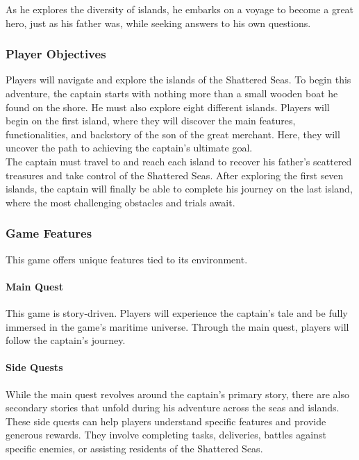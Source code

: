 \documentclass{article}
\begin{document}
As he explores the diversity of islands, he embarks on a voyage to become a great hero, just as his father was, while seeking answers to his own questions.



\subsubsection{Player Objectives}\hfill

Players will navigate and explore the islands of the Shattered Seas. To begin this adventure, the captain starts with nothing more than a small wooden boat he found on the shore. He must also explore eight different islands. Players will begin on the first island, where they will discover the main features, functionalities, and backstory of the son of the great merchant. Here, they will uncover the path to achieving the captain’s ultimate goal.\\

The captain must travel to and reach each island to recover his father’s scattered treasures and take control of the Shattered Seas. After exploring the first seven islands, the captain will finally be able to complete his journey on the last island, where the most challenging obstacles and trials await.



\subsubsection{Game Features}\hfill

This game offers unique features tied to its environment.

\paragraph{Main Quest}\hfill

This game is story-driven. Players will experience the captain's tale and be fully immersed in the game's maritime universe. Through the main quest, players will follow the captain's journey.

\paragraph{Side Quests}\hfill

While the main quest revolves around the captain's primary story, there are also secondary stories that unfold during his adventure across the seas and islands. These side quests can help players understand specific features and provide generous rewards. They involve completing tasks, deliveries, battles against specific enemies, or assisting residents of the Shattered Seas.
\end{document}
